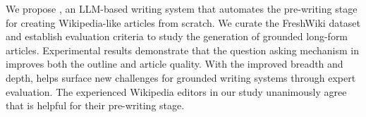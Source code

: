 \label{sec:conclusion}
We propose \system, an LLM-based writing system that automates the pre-writing stage for creating Wikipedia-like articles from scratch. We curate the FreshWiki dataset and establish evaluation criteria to study the generation of grounded long-form articles. Experimental results demonstrate that the question asking mechanism in \system improves both the outline and article quality. 
With the improved breadth and depth, \system helps surface new challenges for grounded writing systems through expert evaluation. The experienced Wikipedia editors in our study unanimously agree that \system is helpful for their pre-writing stage.


